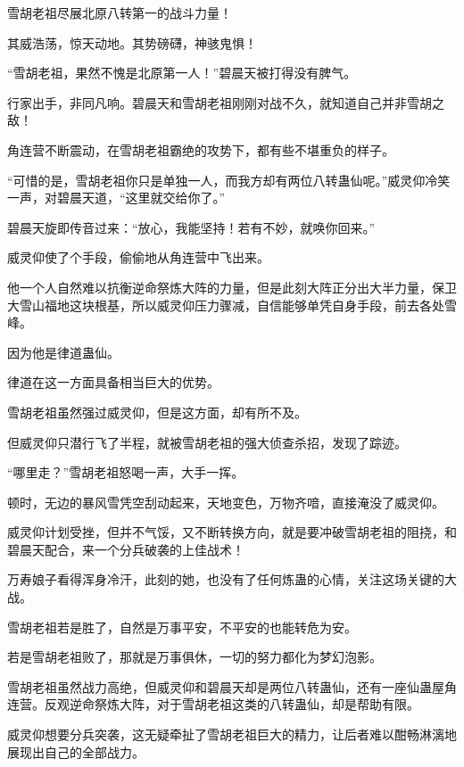 
\begin{this_body}



雪胡老祖尽展北原八转第一的战斗力量！

其威浩荡，惊天动地。其势磅礴，神骇鬼惧！

“雪胡老祖，果然不愧是北原第一人！”碧晨天被打得没有脾气。

行家出手，非同凡响。碧晨天和雪胡老祖刚刚对战不久，就知道自己并非雪胡之敌！

角连营不断震动，在雪胡老祖霸绝的攻势下，都有些不堪重负的样子。

“可惜的是，雪胡老祖你只是单独一人，而我方却有两位八转蛊仙呢。”威灵仰冷笑一声，对碧晨天道，“这里就交给你了。”

碧晨天旋即传音过来：“放心，我能坚持！若有不妙，就唤你回来。”

威灵仰使了个手段，偷偷地从角连营中飞出来。

他一个人自然难以抗衡逆命祭炼大阵的力量，但是此刻大阵正分出大半力量，保卫大雪山福地这块根基，所以威灵仰压力骤减，自信能够单凭自身手段，前去各处雪峰。

因为他是律道蛊仙。

律道在这一方面具备相当巨大的优势。

雪胡老祖虽然强过威灵仰，但是这方面，却有所不及。

但威灵仰只潜行飞了半程，就被雪胡老祖的强大侦查杀招，发现了踪迹。

“哪里走？”雪胡老祖怒喝一声，大手一挥。

顿时，无边的暴风雪凭空刮动起来，天地变色，万物齐喑，直接淹没了威灵仰。

威灵仰计划受挫，但并不气馁，又不断转换方向，就是要冲破雪胡老祖的阻挠，和碧晨天配合，来一个分兵破袭的上佳战术！

万寿娘子看得浑身冷汗，此刻的她，也没有了任何炼蛊的心情，关注这场关键的大战。

雪胡老祖若是胜了，自然是万事平安，不平安的也能转危为安。

若是雪胡老祖败了，那就是万事俱休，一切的努力都化为梦幻泡影。

雪胡老祖虽然战力高绝，但威灵仰和碧晨天却是两位八转蛊仙，还有一座仙蛊屋角连营。反观逆命祭炼大阵，对于雪胡老祖这类的八转蛊仙，却是帮助有限。

威灵仰想要分兵突袭，这无疑牵扯了雪胡老祖巨大的精力，让后者难以酣畅淋漓地展现出自己的全部战力。


\end{this_body}
